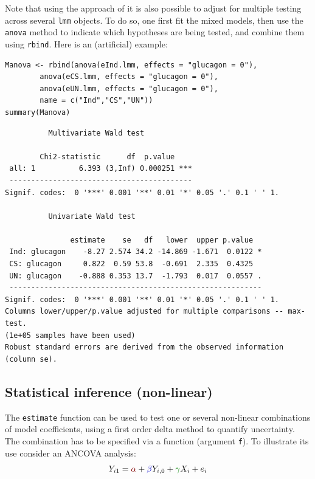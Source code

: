 \documentclass[12pt]{article}
\newcommand{\darkblue}{blue!80!black}
\newcommand{\darkgreen}{green!50!black}
\newcommand{\darkred}{red!50!black}
\begin{document}
Note that using the approach of \cite{pipper2012versatile} it is also
possible to adjust for multiple testing across several \texttt{lmm}
objects. To do so, one first fit the mixed models, then use the
\texttt{anova} method to indicate which hypotheses are being tested, and
combine them using \texttt{rbind}. Here is an (artificial) example:
\lstset{language=r,label= ,caption= ,captionpos=b,numbers=none}
\begin{lstlisting}
Manova <- rbind(anova(eInd.lmm, effects = "glucagon = 0"),
		anova(eCS.lmm, effects = "glucagon = 0"),
		anova(eUN.lmm, effects = "glucagon = 0"),
		name = c("Ind","CS","UN"))
summary(Manova) 
\end{lstlisting}

\begin{verbatim}
	      Multivariate Wald test 

        Chi2-statistic      df  p.value    
 all: 1          6.393 (3,Inf) 0.000251 ***
 ------------------------------------------ 
Signif. codes:  0 '***' 0.001 '**' 0.01 '*' 0.05 '.' 0.1 ' ' 1.

	      Univariate Wald test 

               estimate    se   df   lower  upper p.value  
 Ind: glucagon    -8.27 2.574 34.2 -14.869 -1.671  0.0122 *
 CS: glucagon     0.822  0.59 53.8  -0.691  2.335  0.4325  
 UN: glucagon    -0.888 0.353 13.7  -1.793  0.017  0.0557 .
 ---------------------------------------------------------- 
Signif. codes:  0 '***' 0.001 '**' 0.01 '*' 0.05 '.' 0.1 ' ' 1.
Columns lower/upper/p.value adjusted for multiple comparisons -- max-test.
(1e+05 samples have been used)
Robust standard errors are derived from the observed information (column se).
\end{verbatim}

\clearpage

\subsection{Statistical inference (non-linear)}
\label{sec:org69566a8}

The \texttt{estimate} function can be used to test one or several non-linear
combinations of model coefficients, using a first order delta method
to quantify uncertainty. The combination has to be specified via a
function (argument \texttt{f}). To illustrate its use consider an ANCOVA
analysis:
\[ Y_{i1} = \textcolor{\darkred}{\alpha} + \textcolor{\darkblue}{\beta} Y_{i,0} + \textcolor{\darkgreen}{\gamma} X_{i} + e_{i} \]
\end{document}
